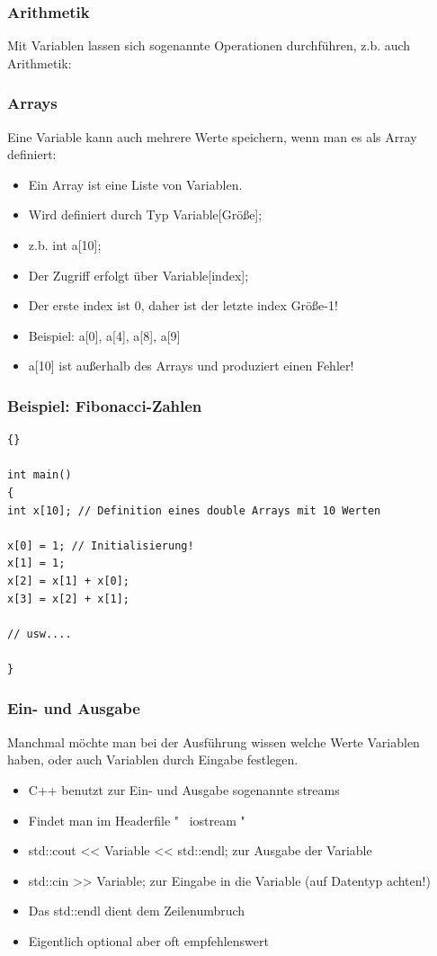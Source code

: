 \documentclass[ignorenonframetext,12pt]{beamer}
\theoremstyle{definition}
\theoremstyle{definition}
\begin{document}
\begin{frame}[fragile]
\frametitle{Arithmetik}
Mit Variablen lassen sich sogenannte Operationen durchführen, z.b. auch Arithmetik:

\end{frame}

\begin{frame}[fragile]
\frametitle{Arrays}
Eine Variable kann auch mehrere Werte speichern,
wenn man es als Array definiert:
\begin{itemize}
\item Ein Array ist eine Liste von Variablen.
\item Wird definiert durch Typ Variable[Grö\ss e];
\item z.b. int a[10];
\item Der Zugriff erfolgt über Variable[index];
\item Der erste index ist 0, daher ist der letzte index Grö\ss e-1!
\item Beispiel: a[0], a[4], a[8], a[9]
\item a[10] ist au\ss erhalb des Arrays und produziert einen Fehler!
\end{itemize}
\end{frame}

\begin{frame}[fragile]
\frametitle{Beispiel: Fibonacci-Zahlen}
{\scriptsize\begin{lstlisting}{}

int main()
{
int x[10]; // Definition eines double Arrays mit 10 Werten

x[0] = 1; // Initialisierung!
x[1] = 1;
x[2] = x[1] + x[0];
x[3] = x[2] + x[1];

// usw....

}
\end{lstlisting}}
\end{frame}

\begin{frame}[fragile]
\frametitle{Ein- und Ausgabe}
Manchmal möchte man bei der Ausführung wissen welche Werte Variablen haben,
oder auch Variablen durch Eingabe festlegen.
\\
\begin{itemize}
\item C++ benutzt zur Ein- und Ausgabe sogenannte streams
\item Findet man im Headerfile " \ iostream "
\item std::cout << Variable << std::endl;  zur Ausgabe der Variable
\item std::cin >> Variable; zur Eingabe in die Variable (auf Datentyp achten!)
\item Das std::endl dient dem Zeilenumbruch
\item Eigentlich optional aber oft empfehlenswert
\end{itemize}
\end{frame}
\end{document}
